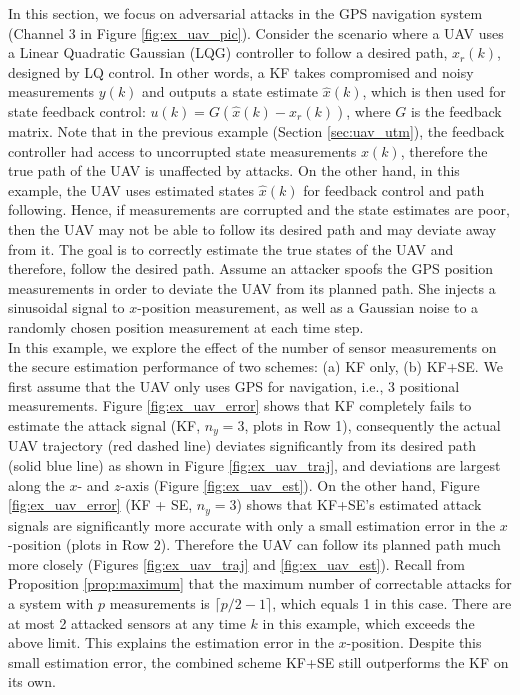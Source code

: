 \documentclass[../../thesis.tex]{subfiles}
\begin{document}
In this section, we focus on adversarial attacks in the GPS navigation system (Channel 3 in Figure \ref{fig:ex_uav_pic}). Consider the scenario where a UAV uses a Linear Quadratic Gaussian (LQG) controller to follow a desired path, $x_r(k)$, designed by LQ control. In other words, a KF takes compromised and noisy measurements $y(k)$ and outputs a state estimate $\hat x(k)$, which is then used for state feedback control: $u(k) = G (\hat x(k) - x_r(k))$, where $G$ is the feedback matrix. Note that in the previous example (Section \ref{sec:uav_utm}), the feedback controller had access to uncorrupted state measurements $x(k)$, therefore the true path of the UAV is unaffected by attacks. On the other hand, in this example, the UAV uses estimated states $\hat x(k)$ for feedback control and path following. Hence, if measurements are corrupted and the state estimates are poor, then the UAV may not be able to follow its desired path and may deviate away from it. The goal is to correctly estimate the true states of the UAV and therefore, follow the desired path. Assume an attacker spoofs the GPS position measurements in order to deviate the UAV from its planned path. She injects a sinusoidal signal to $x$-position measurement, as well as a Gaussian noise to a randomly chosen position measurement at each time step. 
\\
In this example, we explore the effect of the number of sensor measurements on the secure estimation performance of two schemes: (a) KF only, (b) KF+SE.
We first assume that the UAV only uses GPS for navigation, i.e., 3 positional measurements. 
Figure \ref{fig:ex_uav_error} shows that KF completely fails to estimate the attack signal (KF, $n_y = 3$, plots in Row 1), %
consequently the actual UAV trajectory (red dashed line)  deviates significantly from its desired path (solid blue line) as shown in Figure \ref{fig:ex_uav_traj}, and deviations are largest along the $x$- and $z$-axis (Figure \ref{fig:ex_uav_est}).
On the other hand, Figure \ref{fig:ex_uav_error} (KF + SE, $n_y = 3$) shows that KF+SE's estimated attack signals are significantly more accurate with only a small estimation error in the $x$-position (plots in Row 2). 
Therefore the UAV can follow its planned path much more closely (Figures \ref{fig:ex_uav_traj}  and \ref{fig:ex_uav_est}).
Recall from Proposition \ref{prop:maximum} that the maximum number of correctable attacks for a system with $p$ measurements is $\lceil p/2-1 \rceil$, which equals 1 in this case. There are at most 2 attacked sensors at any time $k$ in this example, which exceeds the above limit. This explains the estimation error in the $x$-position. Despite this small estimation error, the combined scheme KF+SE still outperforms the KF on its own.
\end{document}
